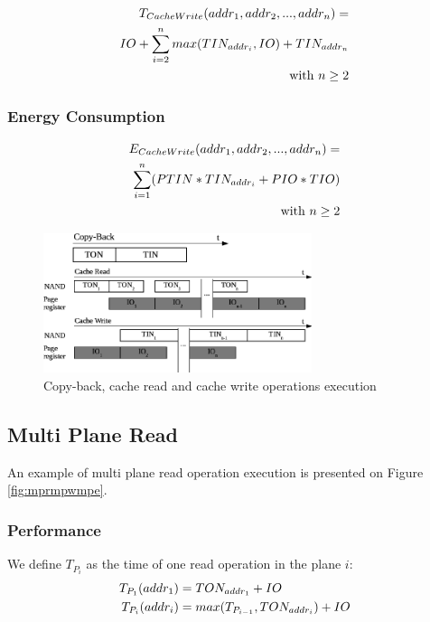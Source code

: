 \documentclass[oneside]{memoir}
\begin{document}
\begin{align} 
T_{CacheWrite}(addr_1, addr_2, ... , addr_n) = 
\notag\\IO + \sum\limits_{i=2}^{n} max(TIN_{addr_i}, IO) + TIN_{addr_n}
\notag\\\text{with } n \ge 2
\end{align}

\subsubsection{Energy Consumption}

\begin{align} E_{CacheWrite}(addr_1, addr_2, ... , addr_n) = 
\notag\\\sum\limits_{i=1}^{n} (PTIN*TIN_{addr_i} + PIO*TIO) 
\notag\\\text{with } n \ge 2
\end{align}

\begin{figure}
  \center
  \includegraphics[width=0.7\textwidth]{Includes/CopyBackCacheReadWrite.png}
  \caption{Copy-back, cache read and cache write operations execution}
  \label{fig:cbcrcw}
\end{figure}

\subsection{Multi Plane Read}

An example of multi plane read operation execution is presented on Figure \ref{fig:mprmpwmpe}.

\subsubsection{Performance}

  We define $T_{P_i}$ as the time of one read operation in the plane $i$:
\begin{align} 
T_{P_1}(addr_1) &= TON_{addr_1} + IO
\notag\\T_{P_i}(addr_i) &= max(T_{P_{i-1}}, TON_{addr_i}) + IO
\end{align}
\end{document}
